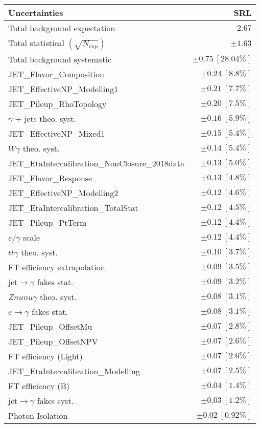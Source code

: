 \begin{tabular}{lr}
\hline
\textbf{Uncertainties} & \textbf{SRL} \\
\hline
Total background expectation & $2.67$ \\
\hline
Total statistical $(\sqrt{N_\mathrm{exp}})$ & $\pm 1.63$ \\
Total background systematic & $\pm 0.75\ [28.04\%]$ \\
\hline
\hline
JET\_Flavor\_Composition & $\pm 0.24\ [8.8\%]$ \\
JET\_EffectiveNP\_Modelling1 & $\pm 0.21\ [7.7\%]$ \\
JET\_Pileup\_RhoTopology & $\pm 0.20\ [7.5\%]$ \\
$\gamma$ + jets theo. syst. & $\pm 0.16\ [5.9\%]$ \\
JET\_EffectiveNP\_Mixed1 & $\pm 0.15\ [5.4\%]$ \\
$W\gamma$ theo. syst. & $\pm 0.14\ [5.4\%]$ \\
JET\_EtaIntercalibration\_NonClosure\_2018data & $\pm 0.13\ [5.0\%]$ \\
JET\_Flavor\_Response & $\pm 0.13\ [4.8\%]$ \\
JET\_EffectiveNP\_Modelling2 & $\pm 0.12\ [4.6\%]$ \\
JET\_EtaIntercalibration\_TotalStat & $\pm 0.12\ [4.5\%]$ \\
JET\_Pileup\_PtTerm & $\pm 0.12\ [4.4\%]$ \\
$e/\gamma$ scale & $\pm 0.12\ [4.4\%]$ \\
$t\bar{t}\gamma$ theo. syst. & $\pm 0.10\ [3.7\%]$ \\
FT efficiency extrapolation & $\pm 0.09\ [3.5\%]$ \\
jet$\to\gamma$ fakes stat. & $\pm 0.09\ [3.2\%]$ \\
$Znunu\gamma$ theo. syst. & $\pm 0.08\ [3.1\%]$ \\
$e\to\gamma$ fakes stat. & $\pm 0.08\ [3.1\%]$ \\
JET\_Pileup\_OffsetMu & $\pm 0.07\ [2.8\%]$ \\
JET\_Pileup\_OffsetNPV & $\pm 0.07\ [2.6\%]$ \\
FT efficiency (Light) & $\pm 0.07\ [2.6\%]$ \\
JET\_EtaIntercalibration\_Modelling & $\pm 0.07\ [2.5\%]$ \\
FT efficiency (B) & $\pm 0.04\ [1.4\%]$ \\
jet$\to\gamma$ fakes syst. & $\pm 0.03\ [1.2\%]$ \\
Photon Isolation & $\pm 0.02\ [0.92\%]$ \\

\end{tabular}
